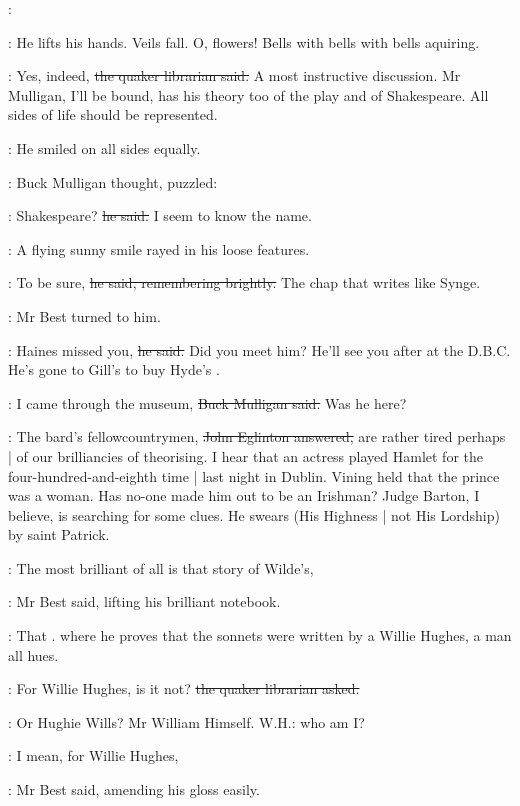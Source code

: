 \StephenInt:

\StephenInt:
He lifts his hands.
Veils fall.
O, flowers!
Bells with bells with bells aquiring.

\librarian:
Yes, indeed,
\sout{the quaker librarian said.}
A most instructive discussion.
Mr Mulligan,
I'll be bound,
has his theory too of the play and of Shakespeare.
All sides of life should be represented.

:
He smiled on all sides equally.

:
Buck Mulligan thought,
puzzled:

\mulligan:
Shakespeare?
\sout{he said.}
I seem to know the name.

:
A flying sunny smile rayed in his loose features.

\mulligan:
To be sure,
\sout{he said, remembering brightly.}
The chap that writes like Synge.

:
Mr Best turned to him.

\best:
Haines missed you,
\sout{he said.}
Did you meet him?
He'll see you after at the D.B.C.
He's gone to Gill's to buy Hyde's .

\mulligan:
I came through the museum,
\sout{Buck Mulligan said.}
Was he here?

\eglinton:
The bard's fellowcountrymen,
\sout{John Eglinton answered,}
are rather tired perhaps |
of our brilliancies of theorising.
I hear that an actress played Hamlet
for the four-hundred-and-eighth time |
last night in Dublin.
Vining held that the prince was a woman.
Has no-one made him out to be an Irishman?
Judge Barton,
I believe,
is searching for some clues.
He swears
(His Highness |
not His Lordship)
by saint Patrick.

\best:
The most brilliant of all is that story of Wilde's,

:
Mr Best said,
lifting his brilliant notebook.

\best:
That .
where he proves that the sonnets were written by a Willie Hughes,
a man all hues.

\librarian:
For Willie Hughes,
is it not?
\sout{the quaker librarian asked.}

\StephenInt:
Or Hughie Wills?
Mr William Himself.
W.H.:
who am I?

\best:
I mean,
for Willie Hughes,

:
Mr Best said, amending his gloss easily.

